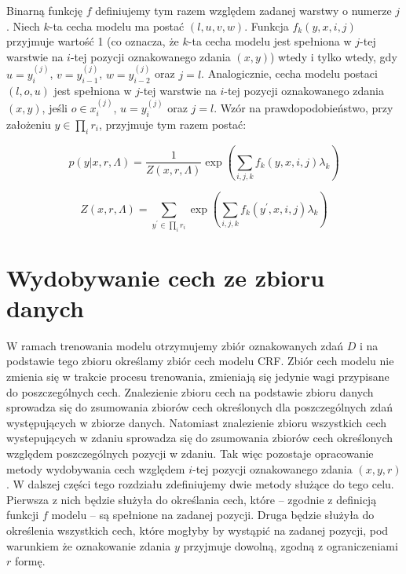 \documentclass[a4paper,10]{article}
\begin{document}
Binarną funkcję $f$ definiujemy tym razem względem zadanej
warstwy o numerze $j$.
Niech $k$-ta cecha modelu ma postać $(l, u, v, w)$.
Funkcja $f_k(y, x, i, j)$ przyjmuje wartość 1 (co oznacza, że $k$-ta cecha modelu
jest spełniona w $j$-tej warstwie na $i$-tej pozycji oznakowanego zdania $(x, y)$)
wtedy i tylko wtedy, gdy $u = y^{(j)}_i$, $v = y^{(j)}_{i-1}$, $w = y^{(j)}_{i-2}$
oraz $j = l$.
Analogicznie, cecha modelu postaci $(l, o, u)$ jest spełniona w $j$-tej warstwie
na $i$-tej pozycji oznakowanego zdania $(x, y)$, jeśli
$o \in x^{(j)}_i$, $u = y^{(j)}_i$ oraz $j = l$.
Wzór na prawdopodobieństwo, przy założeniu $y \in \prod_i r_i$,
przyjmuje tym razem postać:

\begin{equation}\label{eq:layered_p}
p(y \vert x, r, \Lambda) =
  \frac{1}{Z(x, r, \Lambda)} \exp
   \left(
    \sum_{i, j, k} f_k(y, x, i, j) \lambda_k
   \right)
\end{equation}

\begin{equation}\label{eq:layered_z}
Z(x, r, \Lambda) = \sum_{y^\prime \in \prod_i r_i} \exp
\left( \sum_{i, j, k} f_k(y^\prime, x, i, j) \lambda_k \right)
\end{equation}

\section{Wydobywanie cech ze zbioru danych}\label{sec:acquire_feats}

W ramach trenowania modelu otrzymujemy zbiór oznakowanych zdań $D$
i na podstawie
tego zbioru określamy zbiór cech modelu CRF. Zbiór cech modelu nie zmienia się 
w trakcie procesu trenowania, zmieniają się jedynie wagi przypisane do
poszczególnych cech. Znalezienie zbioru cech na podstawie zbioru danych
sprowadza się do zsumowania zbiorów cech określonych dla poszczególnych zdań
występujących w zbiorze danych. Natomiast znalezienie zbioru wszystkich cech
wystepujących w zdaniu sprowadza się do zsumowania zbiorów cech określonych względem
poszczególnych pozycji w zdaniu.
Tak więc pozostaje opracowanie metody wydobywania cech względem $i$-tej pozycji
oznakowanego zdania $(x, y, r)$.
W dalszej części tego rozdziału zdefiniujemy dwie metody służące do tego celu.
Pierwsza z nich będzie służyła do określania cech, które -- zgodnie z definicją
funkcji $f$ modelu -- są spełnione na zadanej pozycji.
Druga będzie służyła do określenia wszystkich cech, które mogłyby by
wystąpić na zadanej pozycji, pod warunkiem że oznakowanie zdania $y$
przyjmuje dowolną, zgodną z ograniczeniami $r$ formę. 
\end{document}
